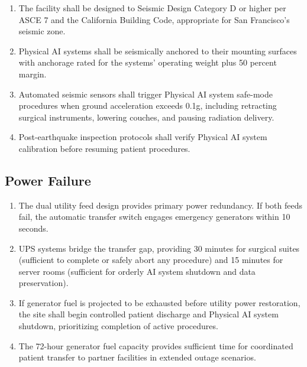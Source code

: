 \documentclass[11pt,letterpaper]{article}
\begin{document}
\begin{enumerate}[label=(\alph*)]
\item The facility shall be designed to Seismic Design Category D or higher
  per ASCE 7 and the California Building Code, appropriate for San Francisco's
  seismic zone.

\item Physical AI systems shall be seismically anchored to their mounting
  surfaces with anchorage rated for the systems' operating weight plus 50
  percent margin.

\item Automated seismic sensors shall trigger Physical AI system safe-mode
  procedures when ground acceleration exceeds 0.1g, including retracting
  surgical instruments, lowering couches, and pausing radiation delivery.

\item Post-earthquake inspection protocols shall verify Physical AI system
  calibration before resuming patient procedures.
\end{enumerate}

\subsection{Power Failure}

\begin{enumerate}[label=(\alph*)]
\item The dual utility feed design provides primary power redundancy. If both
  feeds fail, the automatic transfer switch engages emergency generators
  within 10 seconds.

\item UPS systems bridge the transfer gap, providing 30 minutes for surgical
  suites (sufficient to complete or safely abort any procedure) and 15 minutes
  for server rooms (sufficient for orderly AI system shutdown and data
  preservation).

\item If generator fuel is projected to be exhausted before utility power
  restoration, the site shall begin controlled patient discharge and Physical
  AI system shutdown, prioritizing completion of active procedures.

\item The 72-hour generator fuel capacity provides sufficient time for
  coordinated patient transfer to partner facilities in extended outage
  scenarios.
\end{enumerate}
\end{document}
